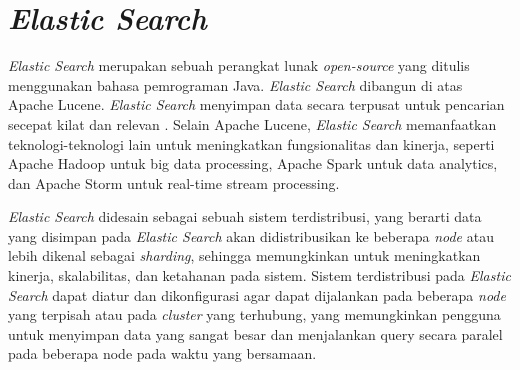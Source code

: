 \section{\textit{Elastic Search}}

\textit{Elastic Search} merupakan sebuah perangkat lunak \textit{open-source} yang ditulis menggunakan bahasa pemrograman Java. \textit{Elastic Search} dibangun di atas Apache Lucene. \textit{Elastic Search} menyimpan data secara terpusat untuk pencarian secepat kilat dan relevan \parencite{elasticsearchorigin}. Selain Apache Lucene, \textit{Elastic Search} memanfaatkan teknologi-teknologi lain untuk meningkatkan fungsionalitas dan kinerja, seperti Apache Hadoop untuk big data processing, Apache Spark untuk data analytics, dan Apache Storm untuk real-time stream processing.

\textit{Elastic Search} didesain sebagai sebuah sistem terdistribusi, yang berarti data yang disimpan pada \textit{Elastic Search} akan didistribusikan ke beberapa \textit{node} atau lebih dikenal sebagai \textit{sharding}, sehingga memungkinkan untuk meningkatkan kinerja, skalabilitas, dan ketahanan pada sistem. Sistem terdistribusi pada \textit{Elastic Search} dapat diatur dan dikonfigurasi agar dapat dijalankan pada beberapa \textit{node} yang terpisah atau pada \textit{cluster} yang terhubung, yang memungkinkan pengguna untuk menyimpan data yang sangat besar dan menjalankan query secara paralel pada beberapa node pada waktu yang bersamaan.

